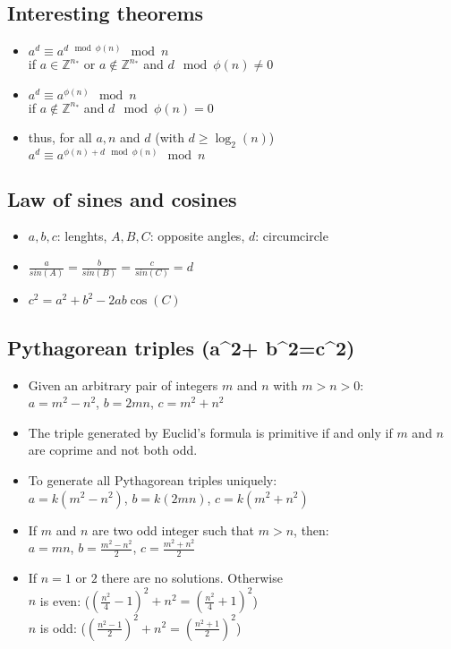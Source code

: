 \documentclass[10pt,letterpaper,twocolumn,twosided]{article}
\begin{document}
\subsection{Interesting theorems}
\begin{itemize}
\item $a^{d} \equiv a^{d \mod \phi(n)} \mod n$ \\
      if $a \in \mathbb{Z}^{n_{*}}$ or $a \notin \mathbb{Z}^{n_{*}}$ and $d \mod \phi(n) \neq 0$
\item $a^{d} \equiv a^{\phi(n)} \mod n$ \\
      if $a \notin \mathbb{Z}^{n_{*}}$ and $d \mod \phi(n) = 0$
\item thus, for all $a, n$ and $d$ (with $d \geq \log_2(n)$) \\
      $a^{d} \equiv a^{\phi(n) + d \mod \phi(n)} \mod n$
\end{itemize}


\subsection{Law of sines and cosines}
\begin{itemize}
\item $a, b, c$: lenghts, $A, B, C$: opposite angles, $d$: circumcircle
\item $\frac{a}{sin(A)} = \frac{b}{sin(B)} = \frac{c}{sin(C)} = d$
\item $c^2 = a^2 + b^2 - 2ab\cos(C)$
\end{itemize}


\subsection{Pythagorean triples (a^2+ b^2=c^2)}
\begin{itemize}
\item Given an arbitrary pair of integers $m$ and $n$ with $m > n > 0$:\\
$a = m^2 - n^2$, $b = 2mn$, $c = m^2 + n^2$
\item The triple generated by Euclid's formula is primitive if and only if $m$ and $n$ are coprime and not both odd.
\item To generate all Pythagorean triples uniquely:\\
$a = k (m^2 - n^2)$, $b = k(2mn)$, $c = k(m^2 + n^2)$
\item If $m$ and $n$ are two odd integer such that $m > n$, then:\\
$a = mn$, $b = \frac{m^2 - n^2}{2}$, $c = \frac{m^2 + n^2}{2}$
\item If $n=1$ or $2$ there are no solutions. Otherwise\\
$n$ is even: ($(\frac{n^2}{4} - 1)^2 + n^2 = (\frac{n^2}{4} + 1)^2$)\\
$n$ is odd: ($(\frac{n^2 - 1}{2})^2 + n^2 = (\frac{n^2 + 1}{2})^2$)
\end{itemize}
\end{document}
